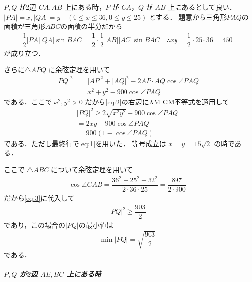 \documentclass[../../main.tex]{subfiles}
\begin{document}
$P, Q$ が2辺 $CA, AB$ 上にある時，$P$ が $CA$，$Q$ が $AB$ 上にあるとして良い．
$|PA|=x, |QA|=y \quad (0 \le x \le 36, 0 \le y \le 25)$ とする．
題意から三角形$PAQ$の面積が三角形$ABC$の面積の半分だから
\begin{align}
  \dfrac{1}{2}|PA||QA|\sin BAC = \dfrac{1}{2}\cdot\dfrac{1}{2}|AB||AC|\sin BAC
  \quad \therefore
  xy = \dfrac{1}{2} \cdot 25 \cdot 36 = 450 \label{eq:1}
\end{align}
が成り立つ．

さらに$\triangle APQ$ に余弦定理を用いて
\begin{align}
  |PQ|^2
  &= |AP|^2 + |AQ|^2 - 2 AP \cdot AQ \cos \angle PAQ \\
  &= x^2 + y^2 - 900 \cos \angle PAQ \label{eq:2}
\end{align}
である．ここで $x^2, y^2 > 0$ だから\cref{eq:2}の右辺にAM-GM不等式を適用して
\begin{align}
  |PQ|^2
  \ge 2\sqrt{x^2y^2} - 900 \cos \angle PAQ \\
  = 2xy - 900 \cos \angle PAQ \\
  = 900 (1 - \cos \angle PAQ) \label{eq:3}
\end{align}
である．ただし最終行で\cref{eq:1}を用いた．
等号成立は $x=y=15\sqrt{2}$ の時である．

ここで $\triangle ABC$ について余弦定理を用いて
\begin{align}
  \cos \angle CAB = \dfrac{36^2 + 25^2 - 32^2}{2 \cdot 36 \cdot 25} = \dfrac{897}{2 \cdot 900}
\end{align}
だから\cref{eq:3}に代入して
\begin{align}
  |PQ|^2 \ge \dfrac{903}{2} \label{eq:4}
\end{align}
であり，この場合の$|PQ|$の最小値は
\begin{align}
  \min |PQ| = \sqrt{\dfrac{903}{2}} \label{eq:5}
\end{align}
である．

\subparagraph{$P, Q$ が2辺 $AB, BC$ 上にある時}
\end{document}

